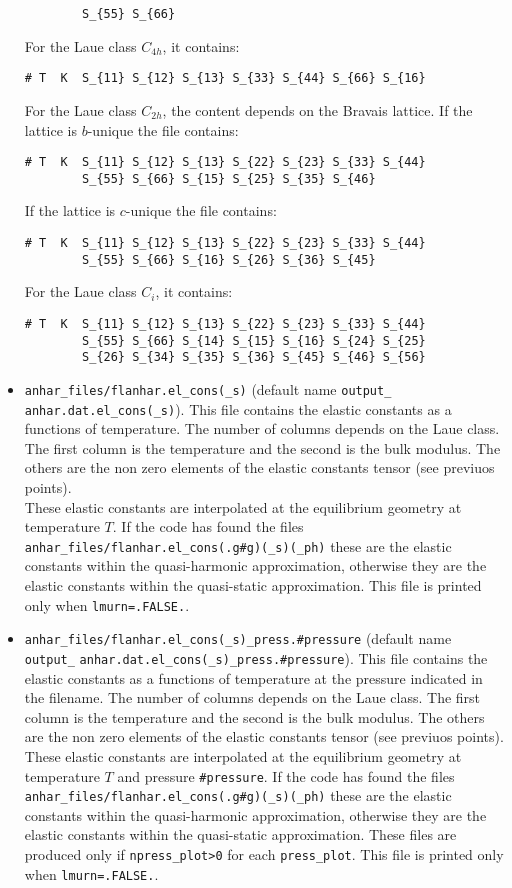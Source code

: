 \documentclass[12pt,a4paper,twoside]{report}
\begin{document}
\begin{itemize}
\begin{verbatim}
        S_{55} S_{66}
\end{verbatim}
For the Laue class $C_{4h}$, it contains:
\begin{verbatim}
# T  K  S_{11} S_{12} S_{13} S_{33} S_{44} S_{66} S_{16}  
\end{verbatim}
For the Laue class $C_{2h}$, the content depends on the Bravais lattice. 
If the lattice is $b$-unique the file contains:
\begin{verbatim}
# T  K  S_{11} S_{12} S_{13} S_{22} S_{23} S_{33} S_{44} 
        S_{55} S_{66} S_{15} S_{25} S_{35} S_{46} 
\end{verbatim}
If the lattice is $c$-unique the file contains:
\begin{verbatim}
# T  K  S_{11} S_{12} S_{13} S_{22} S_{23} S_{33} S_{44} 
        S_{55} S_{66} S_{16} S_{26} S_{36} S_{45} 
\end{verbatim}
For the Laue class $C_i$, it contains:
\begin{verbatim}
# T  K  S_{11} S_{12} S_{13} S_{22} S_{23} S_{33} S_{44} 
        S_{55} S_{66} S_{14} S_{15} S_{16} S_{24} S_{25} 
        S_{26} S_{34} S_{35} S_{36} S_{45} S_{46} S_{56}
\end{verbatim}

\item
\texttt{anhar\_files/flanhar.el\_cons(\_s)}
(default name \texttt{output\_} \texttt{anhar.dat.el\_cons(\_s)}). 
This file
contains the elastic constants as a functions of temperature. The number
of columns depends on the Laue class. The first column is the 
temperature and the second is the bulk modulus. The others are the
non zero elements of the elastic constants tensor (see previuos points). \\ 
These elastic constants are interpolated at the equilibrium geometry at
temperature $T$. If the code has found the files 
\texttt{anhar\_files/flanhar.el\_cons(.g\#g)(\_s)(\_ph)} these are
the elastic constants within the quasi-harmonic approximation, otherwise
they are the elastic constants within the quasi-static approximation.
This file is printed only when \texttt{lmurn=.FALSE.}.

\item
\texttt{anhar\_files/flanhar.el\_cons(\_s)\_press.\#pressure}
(default name \texttt{output\_} 
\texttt{anhar.dat.el\_cons(\_s)\_press.\#pressure}). 
This file contains the elastic constants as a functions of temperature
at the pressure indicated in the filename. The number
of columns depends on the Laue class. The first column is the 
temperature and the second is the bulk modulus. The others are the
non zero elements of the elastic constants tensor (see previuos points). \\ 
These elastic constants are interpolated at the equilibrium geometry at
temperature $T$ and pressure \texttt{\#pressure}. If the code has found 
the files 
\texttt{anhar\_files/flanhar.el\_cons(.g\#g)(\_s)(\_ph)} these are
the elastic constants within the quasi-harmonic approximation, otherwise
they are the elastic constants within the quasi-static approximation.
These files are produced only if \texttt{npress\_plot>0} for each
\texttt{press\_plot}. 
This file is printed only when \texttt{lmurn=.FALSE.}.


\end{itemize}
\end{document}

